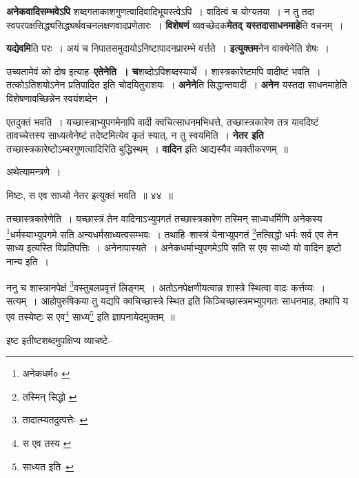 \documentclass[article,12pt,a4paper]{memoir}
\begin{document}
	  \pstart \textbf{अनेकवादिसम्भवेऽपि} शब्दगताकाशगुणत्वादिवादिभूयस्त्वेऽपि । वादित्वं च योग्यतया । न तु तदा स्वपरपक्षसिद्ध्यसिद्ध्यर्थवचनलक्षणवादप्रणेतारः । \textbf{विशेषणं} व्यवच्छेदक\textbf{मेतद् यस्तदासाधनमाहे}ति वचनम् ।
	\pend
      

	  \pstart \textbf{यद्येवमि}ति परः । अयं च निपातसमुदायोऽनिष्टापादनप्रारम्भे वर्त्तते । \textbf{इत्युक्तम}नेन वाक्येनेति शेषः ।
	\pend
      

	  \pstart उच्यतामेवं को दोष इत्याह--\textbf{एतेनेति । च}शब्दोऽपिशब्दस्यार्थे । शास्त्रकारेष्टमपि वादीष्टं भवति । तत्कोऽतिशयोऽनेन प्रतिपादित इति चोदयितुराशयः । \textbf{अनेने}ति सिद्धान्तवादी । \textbf{अनेन} यस्तदा साधनमाहेति विशेषणावच्छिन्नेन स्वयंशब्देन ।
	\pend
      

	  \pstart एतदुक्तं भवति । यच्छास्त्राभ्युपगमेनापि वादी क्वचित्साधनमभिधत्ते, तच्छास्त्रकारेण तत्र यावदिष्टं तावच्चेत्तस्य साध्यत्वेनेष्टं तदेष्टमित्येव कृतं स्यात्, न तु स्वयमिति । \textbf{नेतर इति} तच्छास्त्रकारेष्टोऽम्बरगुणत्वादिरिति बुद्धिस्थम् । \textbf{वादिन} इति आद्यस्यैव व्यक्तीकरणम् ॥
	\pend
      

	  \pstart अथेत्यामन्त्रणे ।
	\pend
	  \bigskip
	  \begingroup
	
	  \bigskip
	  \begingroup
	

	  \pstart मिष्टः, स एव साध्यो नेतर इत्युक्तं भवति ॥ ४४ ॥
	\pend
      
	  \endgroup
	 

	  \pstart तच्छास्त्रकारेणेति । यच्छास्त्रं तेन वादिनाऽभ्युपगतं तच्छास्त्रकारेण तस्मिन् साध्यधर्मिणि अनेकस्य \footnote{अनेकधर्म० \cite{dp-msC}}\-धर्मस्याभ्युपगमे सति अन्यधर्मसाध्यत्वसम्भवः । तथाहि--शास्त्रं येनाभ्युपगतं \footnote{तस्मिन् सिद्धो \cite{dp-edE}}\-तत्सिद्धो धर्मः सर्व एव तेन साध्य इत्यस्ति विप्रतिपत्तिः । अनेनापास्यते । अनेकधर्माभ्युपगमेऽपि सति स एव साध्यो यो वादिन इष्टो नान्य इति ।
	\pend
       

	  \pstart ननु च शास्त्रानपेक्षं \footnote{तादात्म्यतदुत्पत्तेः--\cite{dp-msD-n}}\-वस्तुबलप्रवृत्तं लिङ्गम् । अतोऽनपेक्षणीयत्वान्न शास्त्रे स्थित्वा वादः कर्त्तव्यः । सत्यम् । आहोपुरुषिकया तु यद्यपि क्वचिच्छास्त्रे स्थित इति किञ्चिच्छास्त्रमभ्युपगतः साधनमाह, तथापि य एव तस्येष्टः स एव\footnote{स एव तस्य \cite{dp-msA} \cite{dp-edE}} साध्य\footnote{साध्यत इति--\cite{dp-msC}} इति ज्ञापनायेदमुक्तम् ॥
	\pend
       

	  \pstart इष्ट इतीष्टशब्दमुपक्षिप्य व्याचष्टे--
	\pend
       
	  \bigskip
	  \begingroup
	
\end{document}
